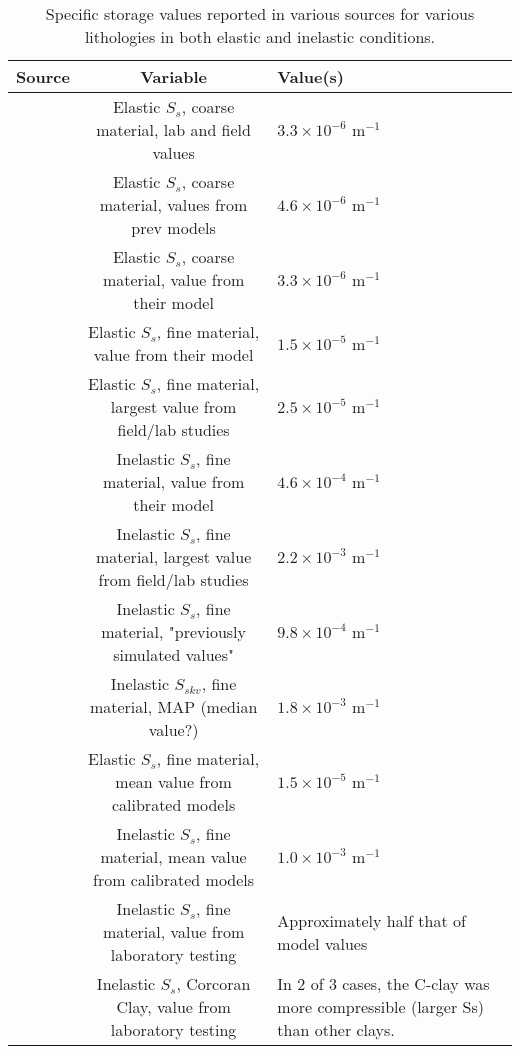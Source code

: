 \documentclass{article}
\begin{document}
\begin{table}[h]
\centering
\begin{tabular}{|c|c|p{4cm}|} 
\hline
\textbf{Source} & \textbf{Variable} & \textbf{Value(s)}\\ 
\hline
\cite{faunt_groundwater_2009} & Elastic $S_s$, coarse material, lab and field values & $3.3 \times 10^{-6}$ m$^{-1}$ \\
\hline 
\cite{faunt_groundwater_2009} & Elastic $S_s$, coarse material, values from prev models & $4.6 \times 10^{-6}$ m$^{-1}$\\
\hline
\cite{faunt_groundwater_2009} & Elastic $S_s$, coarse material, value from their model & $3.3 \times 10^{-6}$ m$^{-1}$ \\
\hline
\cite{faunt_groundwater_2009} & Elastic $S_s$, fine material, value from their model & $1.5 \times 10^{-5}$ m$^{-1}$ \\
\hline
\cite{faunt_groundwater_2009} & Elastic $S_s$, fine material, largest value from field/lab studies & $2.5 \times 10^{-5}$ m$^{-1}$ \\
\hline
\cite{faunt_groundwater_2009} & Inelastic $S_s$, fine material, value from their model & $4.6 \times 10^{-4}$ m$^{-1}$ \\
\hline
\cite{faunt_groundwater_2009} & Inelastic $S_s$, fine material, largest value from field/lab studies & $2.2 \times 10^{-3}$ m$^{-1}$ \\
\hline 
\cite{faunt_groundwater_2009} & Inelastic $S_s$, fine material, "previously simulated values" & $9.8 \times 10^{-4}$ m$^{-1}$ \\
\hline 
\cite{smith_modeling_2019} & Inelastic $S_{skv}$, fine material, MAP (median value?) & $1.8 \times 10^{-3}$ m$^{-1}$ \\
\hline
\cite{sneed_hydraulic_2001} & Elastic $S_s$, fine material, mean value from calibrated models & $1.5 \times 10^{-5}$ m$^{-1}$ \\
\hline
\cite{sneed_hydraulic_2001} & Inelastic $S_s$, fine material, mean value from calibrated models & $1.0 \times 10^{-3}$ m$^{-1}$ \\
\hline
\cite{sneed_hydraulic_2001} & Inelastic $S_s$, fine material, value from laboratory testing & Approximately half that of model values \\
\hline
\cite{sneed_hydraulic_2001} & Inelastic $S_s$, Corcoran Clay, value from laboratory testing & In 2 of 3 cases, the C-clay was more compressible (larger Ss) than other clays. \\
\hline
\end{tabular}
\caption{Specific storage values reported in various sources for various lithologies in both elastic and inelastic conditions.}
\label{table:Ss-values}
\end{table}
\end{document}
